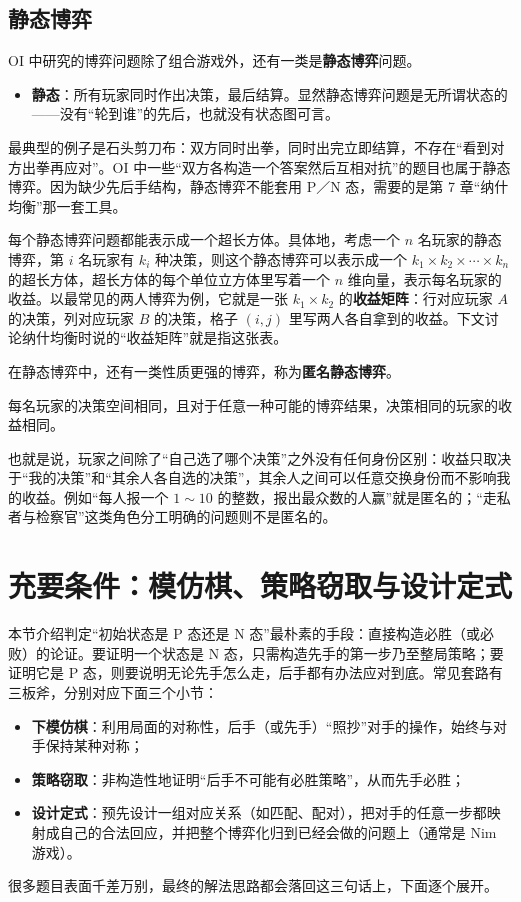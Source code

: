 \section{静态博弈}
OI 中研究的博弈问题除了组合游戏外，还有一类是\textbf{静态博弈}问题。
\begin{itemize}
\item \textbf{静态}：所有玩家同时作出决策，最后结算。显然静态博弈问题是无所谓状态的——没有“轮到谁”的先后，也就没有状态图可言。
\end{itemize}
最典型的例子是石头剪刀布：双方同时出拳，同时出完立即结算，不存在“看到对方出拳再应对”。OI 中一些“双方各构造一个答案然后互相对抗”的题目也属于静态博弈。因为缺少先后手结构，静态博弈不能套用 P／N 态，需要的是第 7 章“纳什均衡”那一套工具。

每个静态博弈问题都能表示成一个超长方体。具体地，考虑一个 $n$ 名玩家的静态博弈，第 $i$ 名玩家有 $k_i$ 种决策，则这个静态博弈可以表示成一个 $k_1\times k_2\times\cdots\times k_n$ 的超长方体，超长方体的每个单位立方体里写着一个 $n$ 维向量，表示每名玩家的收益。以最常见的两人博弈为例，它就是一张 $k_1\times k_2$ 的\textbf{收益矩阵}：行对应玩家 $A$ 的决策，列对应玩家 $B$ 的决策，格子 $(i,j)$ 里写两人各自拿到的收益。下文讨论纳什均衡时说的“收益矩阵”就是指这张表。

在静态博弈中，还有一类性质更强的博弈，称为\textbf{匿名静态博弈}。
\begin{definition}[匿名静态博弈]
每名玩家的决策空间相同，且对于任意一种可能的博弈结果，决策相同的玩家的收益相同。
\end{definition}
也就是说，玩家之间除了“自己选了哪个决策”之外没有任何身份区别：收益只取决于“我的决策”和“其余人各自选的决策”，其余人之间可以任意交换身份而不影响我的收益。例如“每人报一个 $1\sim10$ 的整数，报出最众数的人赢”就是匿名的；“走私者与检察官”这类角色分工明确的问题则不是匿名的。

\chapter{充要条件：模仿棋、策略窃取与设计定式}
本节介绍判定“初始状态是 P 态还是 N 态”最朴素的手段：直接构造必胜（或必败）的论证。要证明一个状态是 N 态，只需构造先手的第一步乃至整局策略；要证明它是 P 态，则要说明无论先手怎么走，后手都有办法应对到底。常见套路有三板斧，分别对应下面三个小节：
\begin{itemize}
\item \textbf{下模仿棋}：利用局面的对称性，后手（或先手）“照抄”对手的操作，始终与对手保持某种对称；
\item \textbf{策略窃取}：非构造性地证明“后手不可能有必胜策略”，从而先手必胜；
\item \textbf{设计定式}：预先设计一组对应关系（如匹配、配对），把对手的任意一步都映射成自己的合法回应，并把整个博弈化归到已经会做的问题上（通常是 Nim 游戏）。
\end{itemize}
很多题目表面千差万别，最终的解法思路都会落回这三句话上，下面逐个展开。

